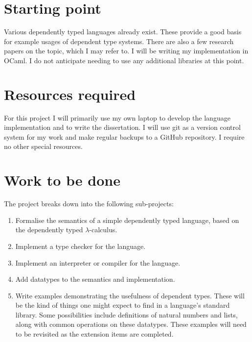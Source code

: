\documentclass[12pt,a4paper,twoside]{article}
\begin{document}
\section*{Starting point}

Various dependently typed languages already exist.
These provide a good basis for example usages of dependent type systems.
There are also a few research papers on the topic, which I may refer to.
I will be writing my implementation in OCaml.
I do not anticipate needing to use any additional libraries at this point.

\section*{Resources required}

For this project I will primarily use my own laptop to develop the language implementation and to write the dissertation.
I will use git as a version control system for my work and make regular backups to a GitHub repository.
I require no other special resources.

\section*{Work to be done}

The project breaks down into the following sub-projects:

\begin{enumerate}

\item Formalise the semantics of a simple dependently typed language, based on the dependently typed \(\lambda\)-calculus.

\item Implement a type checker for the language.

\item Implement an interpreter or compiler for the language.

\item Add datatypes to the semantics and implementation.

\item Write examples demonstrating the usefulness of dependent types.
These will be the kind of things one might expect to find in a language's standard library.
Some possibilities include definitions of natural numbers and lists, along with common operations on these datatypes.
These examples will need to be revisited as the extension items are completed.

\end{enumerate}
\end{document}
